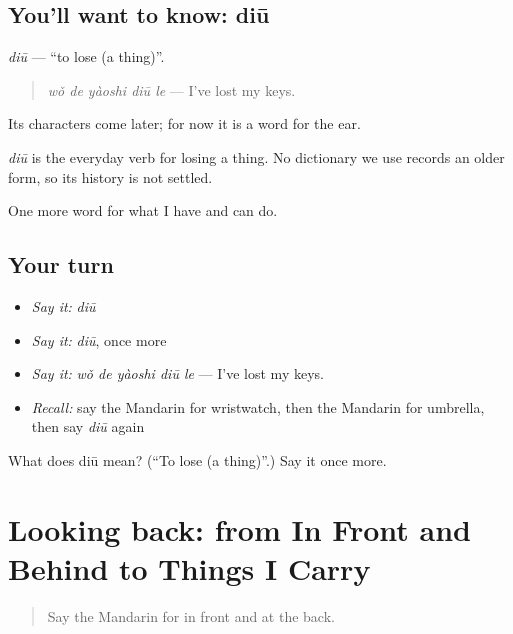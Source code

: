 \subsection*{You'll want to know: diū}
\emph{diū} — \textquotedblleft{}to lose (a thing)\textquotedblright{}.

\begin{quote}
\emph{wǒ de yàoshi diū le} — I've lost my keys.
\end{quote}

Its characters come later; for now it is a word for the ear.

\begin{cousinweb}
\emph{diū} is the everyday verb for losing a thing. No dictionary we use records an older form, so its history is not settled.
\end{cousinweb}

\begin{grammarlens}[title={What you've built}]
One more word for what I have and can do.
\end{grammarlens}

\subsection*{Your turn}
\begin{itemize}
\raggedright
  \item \emph{Say it:} \emph{diū}
  \item \emph{Say it:} \emph{diū}, once more
  \item \emph{Say it:} \emph{wǒ de yàoshi diū le} — I've lost my keys.
  \item \emph{Recall:} say the Mandarin for wristwatch, then the Mandarin for umbrella, then say \emph{diū} again
\end{itemize}

\begin{tcolorbox}[breakable,colback=teal!4,colframe=teal!35!black,title={Before you move on}]
What does diū mean? (\textquotedblleft{}To lose (a thing)\textquotedblright{}.) Say it once more.
\end{tcolorbox}
\section[(dialogue)]{Looking back: from In Front and Behind to Things I Carry}

\label{lesson:ZH-R116-review-111-116}



\begin{quote}
Say the Mandarin for in front and at the back.
\end{quote}

